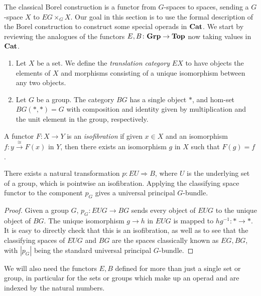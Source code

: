 The classical Borel construction is a functor from $G$-spaces to spaces, sending a $G$-space $X$ to $EG \times_{G} X$. Our goal in this section is to use the formal description of the Borel construction to construct some special operads in $\mathbf{Cat}$.  We start by reviewing the analogues of the functors $E, B \colon \mathbf{Grp} \rightarrow \mathbf{Top}$ now taking values in $\mathbf{Cat}$.

\begin{Defi}\label{Defi:e_b}
  \begin{enumerate}
    \item Let $X$ be a set. We define the \textit{translation category} $EX$ to have objects the elements of $X$ and morphisms consisting of a unique isomorphism between any two objects.
    \item Let $G$ be a group. The category $BG$ has a single object $*$, and hom-set $BG(*,*) = G$ with composition and identity given by multiplication and the unit element in the group, respectively.
  \end{enumerate}
\end{Defi}

\begin{Defi}
A functor $F \colon X \rightarrow Y$ is an \emph{isofibration} if given $x \in X$ and an isomorphism $f\colon y \xrightarrow{\cong} F(x)$ in $Y$, then there exists an isomorphism $g$ in $X$ such that $F(g) = f$.
\end{Defi}

\begin{prop}
There exists a natural transformation $p \colon EU \Rightarrow B$, where $U$ is the underlying set of a group, which is pointwise an isofibration. Applying the classifying space functor to the component $p_{G}$ gives a universal principal $G$-bundle.
\end{prop}
\begin{proof}
Given a group $G$, $p_{G} \colon EUG \rightarrow BG$ sends every object of $EUG$ to the unique object of $BG$. The unique isomorphism $g \rightarrow  h$ in $EUG$ is mapped to $hg^{-1} \colon * \rightarrow *$. It is easy to directly check that this is an isofibration, as well as to see that the classifying spaces of $EUG$ and $BG$ are the spaces classically known as $EG,BG$, with $|p_{G}|$ being the standard universal principal $G$-bundle.
\end{proof}

We will also need the functors $E, B$ defined for more than just a single set or group, in particular for the sets or groups which make up an operad and are indexed by the natural numbers.


